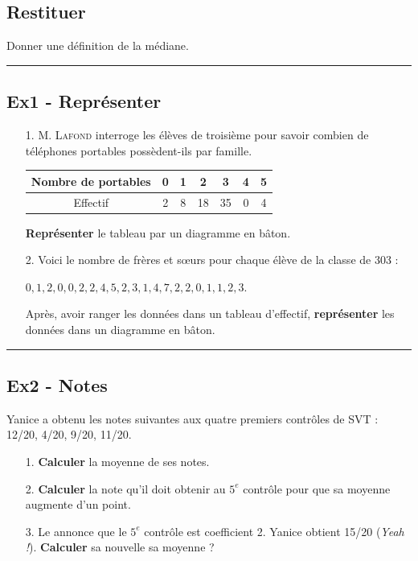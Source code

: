 \documentclass[12pt]{article}
\newcommand{\horrule}[1]{\rule{\linewidth}{#1}} %
\begin{document}
\begin{multicols}{2}

\subsection*{Restituer}

Donner une définition de la médiane. 

\horrule{1px}
\subsection*{Ex1 - Représenter}

\begin{enumerate}
\item[1.] \textsc{M. Lafond} interroge les élèves de troisième pour savoir combien de téléphones portables possèdent-ils par famille.

\begin{center}
  \begin{tabular}{|c||c|c|c|c|c|c|}
    \hline
    Nombre de portables & 0 & 1 & 2 & 3 & 4 & 5 \\
    \hline 
    Effectif & 2 & 8 & 18 & 35 & 0 & 4 \\
    \hline
  \end{tabular}
\end{center}

\textbf{Représenter} le tableau par un diagramme en bâton.

\item[2.] Voici le nombre de frères et sœurs pour chaque élève de la classe de 303 : 

$0, 1, 2, 0, 0, 2, 2, 4, 5, 2, 3, 1, 4, 7, 2, 2, 0, 1, 1, 2, 3.$

Après, avoir ranger les données dans un tableau d'effectif, \textbf{représenter} les données dans un diagramme en bâton.
\end{enumerate}

\horrule{1px}
\subsection*{Ex2 - Notes}

Yanice a obtenu les notes suivantes aux quatre premiers contrôles de SVT : 12/20, 4/20, 9/20, 11/20.

\begin{enumerate}
\item[1.] \textbf{Calculer} la moyenne de ses notes.
\item[2.] \textbf{Calculer} la note qu'il doit obtenir au $5^e$ contrôle pour que sa moyenne augmente d'un point.
\item[3.] Le annonce que le $5^e$ contrôle est coefficient 2. Yanice obtient 15/20 (\textit{Yeah !}). \textbf{Calculer} sa nouvelle sa moyenne ?
\end{enumerate}


\end{multicols}
\end{document}

